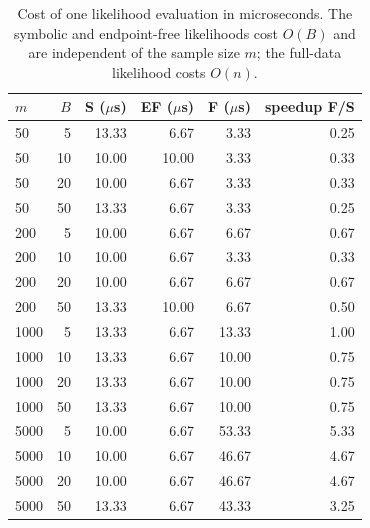 \begin{table}[t]
\centering
\small
\caption{Cost of one likelihood evaluation in microseconds. The symbolic and endpoint-free likelihoods cost $O(B)$ and are independent of the sample size $m$; the full-data likelihood costs $O(n)$.}
\label{tab:sim-scaling}
\begin{tabular}{lrrrrr}
\toprule
$m$ & $B$ & S ($\mu$s) & EF ($\mu$s) & F ($\mu$s) & speedup F/S \\
\midrule
  50 &    5 & 13.33 & 6.67 & 3.33 & 0.25 \\
  50 &   10 & 10.00 & 10.00 & 3.33 & 0.33 \\
  50 &   20 & 10.00 & 6.67 & 3.33 & 0.33 \\
  50 &   50 & 13.33 & 6.67 & 3.33 & 0.25 \\
 200 &    5 & 10.00 & 6.67 & 6.67 & 0.67 \\
 200 &   10 & 10.00 & 6.67 & 3.33 & 0.33 \\
 200 &   20 & 10.00 & 6.67 & 6.67 & 0.67 \\
 200 &   50 & 13.33 & 10.00 & 6.67 & 0.50 \\
1000 &    5 & 13.33 & 6.67 & 13.33 & 1.00 \\
1000 &   10 & 13.33 & 6.67 & 10.00 & 0.75 \\
1000 &   20 & 13.33 & 6.67 & 10.00 & 0.75 \\
1000 &   50 & 13.33 & 6.67 & 10.00 & 0.75 \\
5000 &    5 & 10.00 & 6.67 & 53.33 & 5.33 \\
5000 &   10 & 10.00 & 6.67 & 46.67 & 4.67 \\
5000 &   20 & 10.00 & 6.67 & 46.67 & 4.67 \\
5000 &   50 & 13.33 & 6.67 & 43.33 & 3.25 \\
\bottomrule
\end{tabular}
\end{table}
